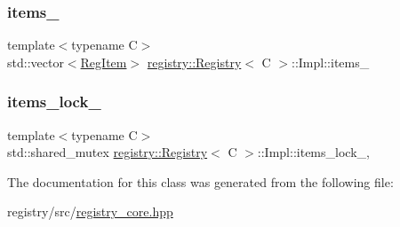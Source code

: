 \mbox{\label{classregistry_1_1Registry_1_1Impl_a889b38b4e83271cf0b2f5dd0b7443754}} 
\subsubsection{\texorpdfstring{items\+\_\+}{items\_}}
{\footnotesize\ttfamily template$<$typename C$>$ \\
std\+::vector$<$\hyperlink{classregistry_1_1RegItem}{Reg\+Item}$>$ \hyperlink{classregistry_1_1Registry}{registry\+::\+Registry}$<$ C $>$\+::Impl\+::items\+\_\+\hspace{0.3cm}{\ttfamily [private]}}

\mbox{\label{classregistry_1_1Registry_1_1Impl_a42ed4f996eacf243c2b6d3703363fc13}} 
\subsubsection{\texorpdfstring{items\+\_\+lock\+\_\+}{items\_lock\_}}
{\footnotesize\ttfamily template$<$typename C$>$ \\
std\+::shared\+\_\+mutex \hyperlink{classregistry_1_1Registry}{registry\+::\+Registry}$<$ C $>$\+::Impl\+::items\+\_\+lock\+\_\+\hspace{0.3cm}{\ttfamily [mutable]}, {\ttfamily [private]}}



The documentation for this class was generated from the following file\+:\begin{DoxyCompactItemize}
\item 
registry/src/\hyperlink{registry__core_8hpp}{registry\+\_\+core.\+hpp}\end{DoxyCompactItemize}
